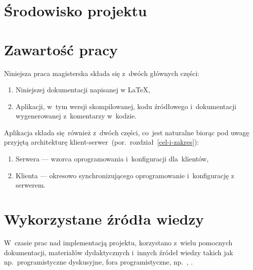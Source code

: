 \documentclass[thesis]{subfiles}
\begin{document}

\section{Środowisko projektu}


\section{Zawartość pracy}

\noindent Niniejsza praca magisterska składa się z~dwóch głównych części:
\begin{enumerate}
	\item Niniejszej dokumentacji napisanej w \LaTeX,
	\item Aplikacji, w~tym wersji skompilowanej, kodu źródłowego i~dokumentacji wygenerowanej z~komentarzy w~kodzie.
\end{enumerate}
Aplikacja składa się~również z~dwóch części, co~jest naturalne biorąc pod uwagę przyjętą architekturę klient-serwer~(por.~rozdział~\ref{cel-i-zakres}):
\begin{enumerate}
	\item Serwera --- wzorca oprogramowania i~konfiguracji dla~klientów,
	\item Klienta --- okresowo synchronizującego oprogramowanie i~konfigurację z serwerem.
\end{enumerate}


\section{Wykorzystane źródła wiedzy}

W~czasie prac nad implementacją projektu, korzystano z~wielu pomocnych dokumentacji, materiałów dydaktycznych i~innych źródeł wiedzy takich jak np.~programistyczne dyskusyjne, fora programistyczne, np.~, .
\end{document}
